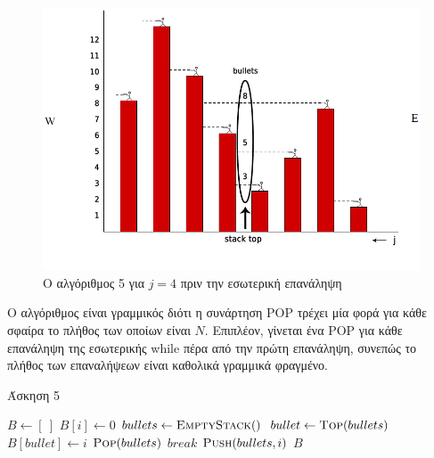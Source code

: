 \documentclass[11pt,a4paper]{book}
\begin{document}
\begin{figure}
	\caption{Ο αλγόριθμος 5 για $j = 4$ πριν την εσωτερική επανάληψη}
	\includegraphics[width=1\textwidth]{5.png}
\end{figure}

Ο αλγόριθμος είναι γραμμικός διότι η συνάρτηση \textlatin{POP} τρέχει μία φορά για κάθε σφαίρα το πλήθος των οποίων είναι $N$. Επιπλέον, γίνεται ένα \textlatin{POP} για κάθε επανάληψη της εσωτερικής \textlatin{while} πέρα από την πρώτη επανάληψη, συνεπώς το πλήθος των επαναλήψεων είναι καθολικά γραμμικά φραγμένο.

\begin{algorithm}[H]
\caption{\textgreek{Άσκηση 5}}
\begin{algorithmic}[1]
    \State $B \gets [\ ]$
   		\State $B[ i ] \gets 0$
   	\EndFor
    \State $bullets \gets \Call{EmptyStack}$
            \State $bullet \gets \Call{Top}{bullets}$
                \State $B[ bullet ] \gets i$
                \State $\Call{Pop}{bullets}$
            \Else
                \State $break$
            \EndIf
        \EndWhile
        \State $\Call{Push}{bullets, i}$
    \EndFor
    \State \Return $B$
\EndProcedure
\end{algorithmic}
\end{algorithm}

\end{document}
